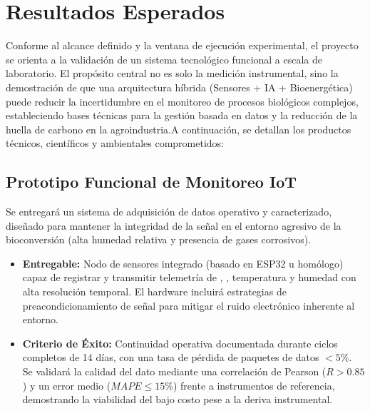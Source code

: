 \chapter{Resultados Esperados}

Conforme al alcance definido y la ventana de ejecución experimental, el proyecto se orienta a la validación de un sistema tecnológico funcional a escala de laboratorio. El propósito central no es solo la medición instrumental, sino la demostración de que una arquitectura híbrida (Sensores + IA + Bioenergética) puede reducir la incertidumbre en el monitoreo de procesos biológicos complejos, estableciendo bases técnicas para la gestión basada en datos y la reducción de la huella de carbono en la agroindustria.A continuación, se detallan los productos técnicos, científicos y ambientales comprometidos:

\section{Prototipo Funcional de Monitoreo IoT}Se entregará un sistema de adquisición de datos operativo y caracterizado, diseñado para mantener la integridad de la señal en el entorno agresivo de la bioconversión (alta humedad relativa y presencia de gases corrosivos).\begin{itemize}\item \textbf{Entregable:} Nodo de sensores integrado (basado en ESP32 u homólogo) capaz de registrar y transmitir telemetría de , , temperatura y humedad con alta resolución temporal. El hardware incluirá estrategias de preacondicionamiento de señal para mitigar el ruido electrónico inherente al entorno.\item \textbf{Criterio de Éxito:} Continuidad operativa documentada durante ciclos completos de 14 días, con una tasa de pérdida de paquetes de datos $< 5\%$. Se validará la calidad del dato mediante una correlación de Pearson ($R > 0.85$) y un error medio ($MAPE \leq 15\%$) frente a instrumentos de referencia, demostrando la viabilidad del bajo costo pese a la deriva instrumental.\end{itemize}

